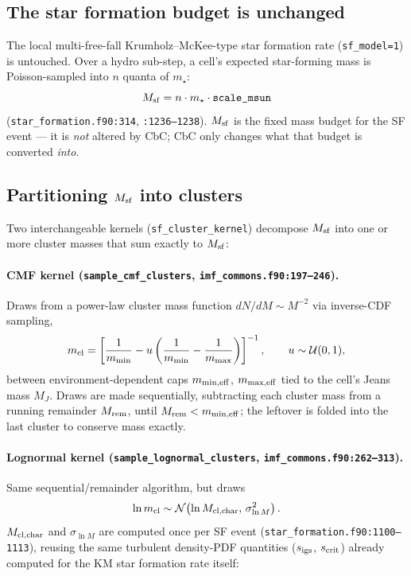 \documentclass[11pt]{article}
\newcommand{\code}[1]{\texttt{#1}}
\begin{document}
\subsection{The star formation budget is unchanged}

The local multi-free-fall Krumholz--McKee-type star formation rate
(\code{sf\_model=1}) is untouched. Over a hydro sub-step, a cell's expected
star-forming mass is Poisson-sampled into $n$ quanta of $m_\star$:
\[
M_{\rm sf} = n \cdot m_\star \cdot \code{scale\_msun}
\]
(\code{star\_formation.f90:314}, \code{:1236--1238}). $M_{\rm sf}$ is the
fixed mass budget for the SF event --- it is \emph{not} altered by CbC; CbC
only changes what that budget is converted \emph{into}.

\subsection{Partitioning $M_{\rm sf}$ into clusters}

Two interchangeable kernels (\code{sf\_cluster\_kernel}) decompose $M_{\rm
sf}$ into one or more cluster masses that sum exactly to $M_{\rm sf}$:

\paragraph{CMF kernel (\code{sample\_cmf\_clusters}, \code{imf\_commons.f90:197--246}).}
Draws from a power-law cluster mass function $dN/dM \sim M^{-2}$ via
inverse-CDF sampling,
\[
m_{\rm cl} = \left[\frac{1}{m_{\rm min}} - u\left(\frac{1}{m_{\rm min}} -
\frac{1}{m_{\rm max}}\right)\right]^{-1}, \qquad u \sim \mathcal{U}(0,1),
\]
between environment-dependent caps $m_{\rm min,eff}$, $m_{\rm max,eff}$ tied
to the cell's Jeans mass $M_J$. Draws are made sequentially, subtracting
each cluster mass from a running remainder $M_{\rm rem}$, until $M_{\rm
rem} < m_{\rm min,eff}$; the leftover is folded into the last cluster to
conserve mass exactly.

\paragraph{Lognormal kernel (\code{sample\_lognormal\_clusters}, \code{imf\_commons.f90:262--313}).}
Same sequential/remainder algorithm, but draws
\[
\ln m_{\rm cl} \sim \mathcal{N}\!\left(\ln M_{\rm cl,char},\, \sigma_{\ln
M}^2\right).
\]
$M_{\rm cl,char}$ and $\sigma_{\ln M}$ are computed once per SF event
(\code{star\_formation.f90:1100--1113}), reusing the same turbulent
density-PDF quantities ($s_{\rm igs}$, $s_{\rm crit}$) already computed for
the KM star formation rate itself:
\end{document}
